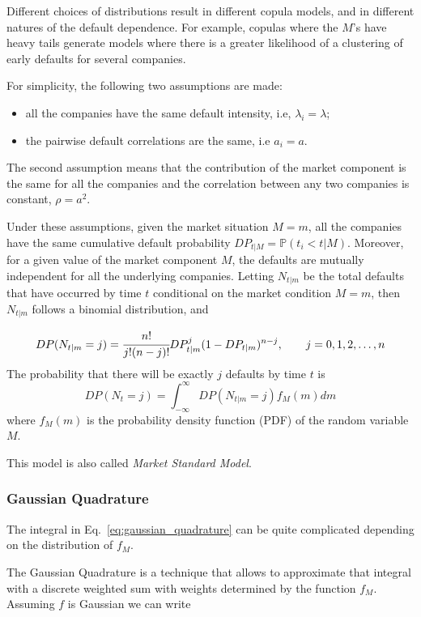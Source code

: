 Different choices of distributions result in different copula models,
and in different natures of the default dependence. For example, copulas
where the \(M\)'s have heavy tails generate models where there is a
greater likelihood of a clustering of early defaults for several
companies.

For simplicity, the following two assumptions are made:

\begin{itemize}
	\tightlist
	\item
	all the companies have the same default intensity, i.e,
	\(\lambda_i = \lambda\);
	\item
	the pairwise default correlations are the same, i.e \(a_i = a\).
\end{itemize}

The second assumption means that the contribution of the market
component is the same for all the companies and the correlation between
any two companies is constant, \(\rho = a^2\).

Under these assumptions, given the market situation \(M = m\), all the
companies have the same cumulative default probability
\(DP_{t|M}=\mathbb{P}(t_i < t|M)\). Moreover, for a given value of the
market component \(M\), the defaults are mutually independent for all
the underlying companies. Letting \(N_{t|m}\) be the total defaults that
have occurred by time \(t\) conditional on the market condition
\(M = m\), then \(N_{t|m}\) follows a binomial distribution, and

\[DP(N_{t|m} = j) = \cfrac{n!}{j!(n-j)!}DP^j_{t|m}(1-DP_{t|m})^{n-j},\qquad  j=0, 1, 2,\ldots,n\]
The probability that there will be exactly \(j\) defaults by time \(t\)
is
\begin{equation}
DP(N_{t} = j) = \int_{-\infty}^{\infty}{DP(N_{t|m} = j)f_M(m)dm}
\label{eq:gaussian_quadrature}
\end{equation}
where \(f_M(m)\) is the probability density function (PDF) of the random
variable \(M\).

This model is also called \emph{Market Standard Model}.

\subsubsection{Gaussian Quadrature}\label{gaussian-quadrature}
The integral in Eq.~\ref{eq:gaussian_quadrature} can be quite
complicated depending on the distribution of \(f_M\).

The Gaussian Quadrature is a technique that allows to approximate that
integral with a discrete weighted sum with weights determined by the
function \(f_M\). Assuming \(f\) is Gaussian we can write

